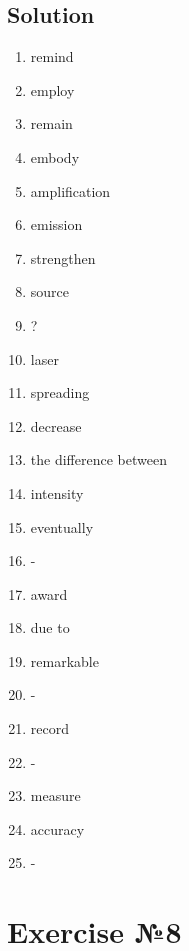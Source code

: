 \subsection*{Solution}
\begin{enumerate}
      \item remind
      \item employ
      \item remain
      \item embody
      \item amplification
      \item emission
      \item strengthen
      \item source
      \item ?
      \item laser
      \item spreading
      \item decrease
      \item the difference between
      \item intensity
      \item eventually
      \item -
      \item award
      \item due to
      \item remarkable
      \item -
      \item record
      \item -
      \item measure
      \item accuracy
      \item -
\end{enumerate}

\section*{Exercise №8}

